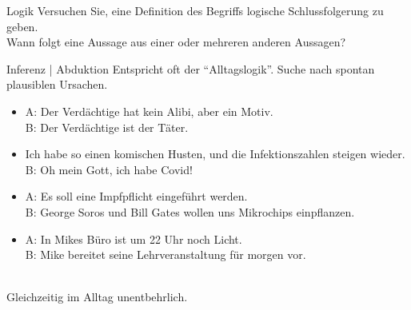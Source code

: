 \begin{frame}
  {Logik}
  \onslide<+->
  \onslide<+->
  \centering 
  Versuchen Sie, eine Definition des Begriffs \alert{logische Schlussfolgerung} zu geben.\\
  \onslide<+->
  \Zeile
  Wann folgt eine Aussage aus einer oder mehreren anderen Aussagen?
\end{frame}

\begin{frame}
  {Inferenz | Abduktion}
  \onslide<+->
  \onslide<+->
  Entspricht oft der "`Alltagslogik"'. Suche nach \alert{spontan plausiblen Ursachen}.\\
  \Halbzeile
  \begin{itemize}[<+->]
    \item A: Der Verdächtige hat kein Alibi, aber ein Motiv.\\
      B: Der Verdächtige ist der Täter.
    \item Ich habe so einen komischen Husten, und die Infektionszahlen steigen wieder.\\
      B: Oh mein Gott, ich habe Covid!
    \item A: Es soll eine Impfpflicht eingeführt werden.\\
      B: George Soros und Bill Gates wollen uns Mikrochips einpflanzen.
    \item A: In Mikes Büro ist um 22 Uhr noch Licht.\\
      B: Mike bereitet seine Lehrveranstaltung für morgen vor.
  \end{itemize}
  \onslide<+->
  \centering 
  \Zeile 
  \\
  \alert{Gleichzeitig im Alltag unentbehrlich.}\\
\end{frame}

